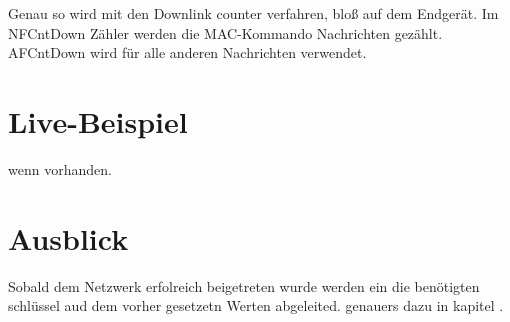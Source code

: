 \documentclass[a4paper,12pt]{article}
\begin{document}
            Genau so wird mit den Downlink counter verfahren, bloß auf dem Endgerät. Im NFCntDown Zähler werden die 
            MAC-Kommando Nachrichten gezählt. AFCntDown wird für alle anderen Nachrichten verwendet.\cite[S.22 ff]{LoRaSec}

    \section{Live-Beispiel}
        wenn vorhanden.

    \section{Ausblick}

    Sobald dem Netzwerk erfolreich beigetreten wurde werden ein die benötigten schlüssel aud dem vorher gesetzetn Werten abgeleited. genauers dazu in kapitel .
        \newpage
    
    
\end{document}
